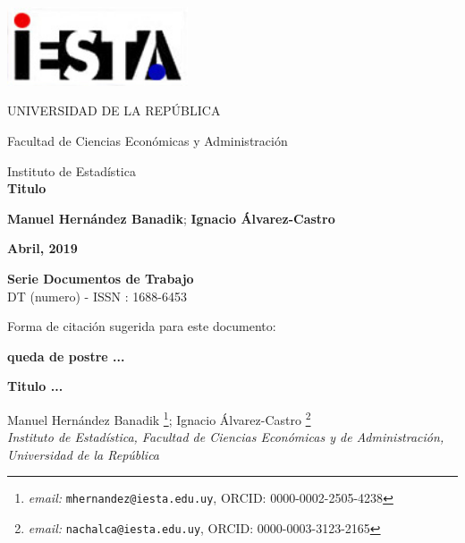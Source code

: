 \documentclass[12pt]{article}\usepackage[]{graphicx}\usepackage[]{color}
\begin{document}
	
	\thispagestyle{empty} 
	\begin {center}
	\includegraphics[width=0.40\textwidth]{logo_iesta.png}
		
	UNIVERSIDAD DE LA REPÚBLICA
	
	Facultad de Ciencias Económicas y Administración

	Instituto de Estadística\\
	\vspace{4.5 cm}
\textbf{\Large Titulo}	
\vspace{1.5 cm}
	
\textbf{Manuel Hernández Banadik};
\textbf{Ignacio Álvarez-Castro}\\
\vspace{0.5 cm}
	
\textbf{Abril, 2019}
\end{center}
\vspace{1.5cm}

\begin{center}
{\Huge \textbf{Serie Documentos de Trabajo}}\\
\vspace{1.0 cm}
\noindent  DT (numero) - ISSN : 1688-6453 
\end{center}
\pagebreak
\thispagestyle{empty} 
\vspace{15.5cm}

Forma de citación sugerida para este documento: 
\begin{flushleft}
\textbf{queda de postre ... }
\end{flushleft}

\newpage

\setcounter{page}{1} 
\thispagestyle{empty} 

\begin{center}
	\textbf{Titulo ... }
\end{center}

\begin{center}
  Manuel Hernández Banadik \footnote{\emph{email: }\texttt{mhernandez@iesta.edu.uy}, ORCID: 0000-0002-2505-4238\label{fn:foot_Manuel}};	Ignacio Álvarez-Castro \footnote{\emph{email: }\texttt{nachalca@iesta.edu.uy}, ORCID: 0000-0003-3123-2165\label{fn:foot_Nacho}}\\
		{\small \emph{Instituto de Estadística, Facultad de Ciencias Económicas y de Administración, Universidad de la República}}
\end{center}
\end{document}
